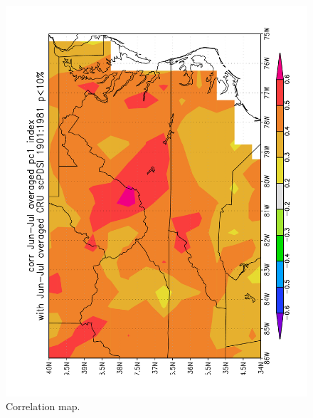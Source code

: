 \begin{figure}
\centering
\includegraphics[width=5in, angle=-90]{figures/corrMapPdsiJJ.pdf}
\caption{Correlation map.}
\label{fig:pdsiCorrMap}
\end{figure}


